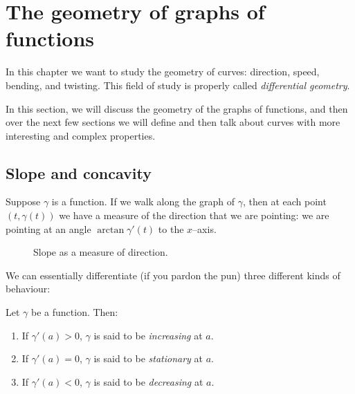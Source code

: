 \section{The geometry of graphs of functions}
In this chapter we want to study the geometry of curves: direction, speed, bending,
and twisting. This field of study is properly called \emph{differential geometry}.

In this section, we will discuss the geometry of the graphs of functions, and then over the next
few sections we will define and then talk about curves with more interesting and complex
properties.

\subsection{Slope and concavity}
Suppose $ \gamma $ is a function. If we walk along the graph of $ \gamma $, then
at each point $ (t, \gamma(t)) $ we have a measure of the direction that we are
pointing: we are pointing at an angle $ \arctan \gamma'(t) $ to the $ x$--axis.

\begin{figure}
  \centering
  \caption{Slope as a measure of direction.}
\end{figure}

We can essentially differentiate (if you pardon the pun) three different kinds of behaviour:
\begin{defn}
  Let $ \gamma $ be a function. Then:
  \begin{enumerate}
    \item If $ \gamma'(a) > 0 $, $ \gamma $ is said to be \emph{increasing} at $ a $.
    \item If $ \gamma'(a) = 0 $, $ \gamma $ is said to be \emph{stationary} at $ a $.
    \item If $ \gamma'(a) < 0 $, $ \gamma $ is said to be \emph{decreasing} at $ a $.
  \end{enumerate}
\end{defn}

